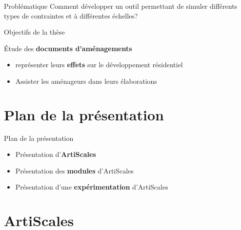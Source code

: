 \documentclass[xcolor=table]{beamer}
\begin{document}
\begin{frame}{Problématique}
		Comment développer un outil permettant de simuler différents types de contraintes et à différentes échelles? 
\end{frame}

\begin{frame}{Objectifs de la thèse}
	\begin{block}{}
	Étude des \textbf{documents d'aménagements}
		\begin{itemize}
			\item représenter leurs \textbf{effets} sur le développement résidentiel
			\item Assister les aménageurs dans leurs élaborations
		\end{itemize}
	\end{block}
\end{frame}




\section[Plan]{Plan de la présentation}




\begin{frame}{Plan de la présentation}
	\begin{itemize}
		\item Présentation d'\textbf{ArtiScales}
		\item Présentation des \textbf{modules} d'ArtiScales
		\item Présentation d'une \textbf{expérimentation} d'ArtiScales
	\end{itemize}
\end{frame}




\section{ArtiScales}
\end{document}
